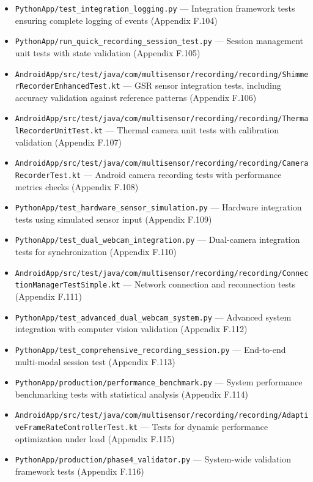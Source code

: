 \documentclass[11pt,a4paper]{report}
\begin{document}
{{\begin{itemize}
\item \texttt{PythonApp/test\_integration\_logging.py} --- Integration framework tests
  ensuring complete logging of events (Appendix F.104)
\item \texttt{PythonApp/run\_quick\_recording\_session\_test.py} --- Session management
  unit tests with state validation (Appendix F.105)
\item \texttt{AndroidApp/src/test/java/com/multisensor/recording/recording/ShimmerRecorderEnhancedTest.kt}
  --- GSR sensor integration tests, including accuracy validation against
  reference patterns (Appendix F.106)
\item \texttt{AndroidApp/src/test/java/com/multisensor/recording/recording/ThermalRecorderUnitTest.kt}
  --- Thermal camera unit tests with calibration validation (Appendix
  F.107)
\item \texttt{AndroidApp/src/test/java/com/multisensor/recording/recording/CameraRecorderTest.kt}
  --- Android camera recording tests with performance metrics checks
  (Appendix F.108)
\item \texttt{PythonApp/test\_hardware\_sensor\_simulation.py} --- Hardware integration
  tests using simulated sensor input (Appendix F.109)
\item \texttt{PythonApp/test\_dual\_webcam\_integration.py} --- Dual-camera integration
  tests for synchronization (Appendix F.110)
\item \texttt{AndroidApp/src/test/java/com/multisensor/recording/recording/ConnectionManagerTestSimple.kt}
  --- Network connection and reconnection tests (Appendix F.111)
\item \texttt{PythonApp/test\_advanced\_dual\_webcam\_system.py} --- Advanced system
  integration with computer vision validation (Appendix F.112)
\item \texttt{PythonApp/test\_comprehensive\_recording\_session.py} --- End-to-end
  multi-modal session test (Appendix F.113)
\item \texttt{PythonApp/production/performance\_benchmark.py} --- System performance
  benchmarking tests with statistical analysis (Appendix F.114)
\item \texttt{AndroidApp/src/test/java/com/multisensor/recording/recording/AdaptiveFrameRateControllerTest.kt}
  --- Tests for dynamic performance optimization under load (Appendix
  F.115)
\item \texttt{PythonApp/production/phase4\_validator.py} --- System-wide validation
  framework tests (Appendix F.116)

\end{itemize}}}
\end{document}
